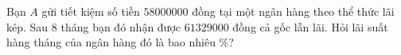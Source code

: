 \begin{bt}%
	Bạn $A$ gửi tiết kiệm số tiền $58000000$ đồng tại một ngân hàng theo thể thức lãi kép. Sau $8$ tháng bạn đó nhận được $61329000$ đồng cả gốc lẫn lãi. Hỏi lãi suất hàng tháng của ngân hàng đó là bao nhiêu $\%$?\par
\end{bt}

